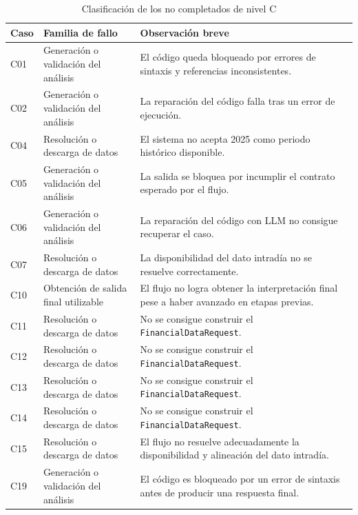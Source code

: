 \begin{table}[H]
\centering
\begin{tabularx}{\textwidth}{L{1.2cm}L{4.8cm}Y}
\toprule
Caso & Familia de fallo & Observaci\'on breve \\
\midrule
C01 & Generaci\'on o validaci\'on del an\'alisis & El c\'odigo queda bloqueado por errores de sintaxis y referencias inconsistentes. \\
C02 & Generaci\'on o validaci\'on del an\'alisis & La reparaci\'on del c\'odigo falla tras un error de ejecuci\'on. \\
C04 & Resoluci\'on o descarga de datos & El sistema no acepta 2025 como periodo hist\'orico disponible. \\
C05 & Generaci\'on o validaci\'on del an\'alisis & La salida se bloquea por incumplir el contrato esperado por el flujo. \\
C06 & Generaci\'on o validaci\'on del an\'alisis & La reparaci\'on del c\'odigo con LLM no consigue recuperar el caso. \\
C07 & Resoluci\'on o descarga de datos & La disponibilidad del dato intrad\'ia no se resuelve correctamente. \\
C10 & Obtenci\'on de salida final utilizable & El flujo no logra obtener la interpretaci\'on final pese a haber avanzado en etapas previas. \\
C11 & Resoluci\'on o descarga de datos & No se consigue construir el \texttt{FinancialDataRequest}. \\
C12 & Resoluci\'on o descarga de datos & No se consigue construir el \texttt{FinancialDataRequest}. \\
C13 & Resoluci\'on o descarga de datos & No se consigue construir el \texttt{FinancialDataRequest}. \\
C14 & Resoluci\'on o descarga de datos & No se consigue construir el \texttt{FinancialDataRequest}. \\
C15 & Resoluci\'on o descarga de datos & El flujo no resuelve adecuadamente la disponibilidad y alineaci\'on del dato intrad\'ia. \\
C19 & Generaci\'on o validaci\'on del an\'alisis & El c\'odigo es bloqueado por un error de sintaxis antes de producir una respuesta final. \\
\bottomrule
\end{tabularx}
\caption{Clasificaci\'on de los no completados de nivel C}
\label{tab:no-completados-c}
\end{table}

